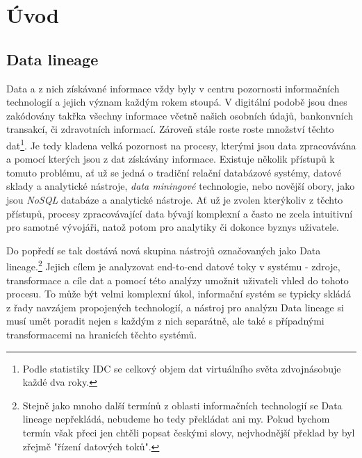 \chapter{Úvod}
\label{sec:uvod}
\section{Data lineage}

Data a z nich získávané informace vždy byly v centru pozornosti informačních technologií a jejich význam každým rokem stoupá. V digitální podobě jsou dnes zakódovány takřka všechny informace včetně našich osobních údajů, bankonvních transakcí, či zdravotních informací. Zároveň stále roste roste množství těchto dat\footnote{Podle statistiky IDC \cite{Idc14} se celkový objem dat virtuálního světa zdvojnásobuje každé dva roky.}.
Je tedy kladena velká pozornost na procesy, kterými jsou data zpracovávána a pomocí kterých jsou z dat získávány informace. Existuje několik přístupů k tomuto problému, ať už se jedná o tradiční relační databázové systémy, datové sklady a \textit{} analytické nástroje, \textit{data miningové} technologie, nebo novější obory, jako jsou \textit{NoSQL} databáze a analytické nástroje. Ať už je zvolen kterýkoliv z těchto přístupů, procesy zpracovávající data bývají komplexní a často ne zcela intuitivní pro samotné vývojáři, natož potom pro analytiky či dokonce byznys uživatele. 

Do popředí se tak dostává nová skupina nástrojů označovaných jako Data lineage.\footnote{Stejně jako mnoho další termínů z oblasti informačních technologií se Data lineage nepřekládá, nebudeme ho tedy překládat ani my. Pokud bychom termín však přeci jen chtěli popsat českými slovy, nejvhodnější překlad by byl zřejmě "řízení datových toků".}
Jejich cílem je analyzovat end-to-end datové toky v systému - zdroje, transformace a cíle dat a pomocí této analýzy umožnit uživateli vhled do tohoto procesu. To může být velmi komplexní úkol, informační systém se typicky skládá z řady navzájem propojených technologií, a nástroj pro analýzu Data lineage si musí umět poradit nejen s každým z nich separátně, ale také s případnými transformacemi na hranicích těchto systémů. 


